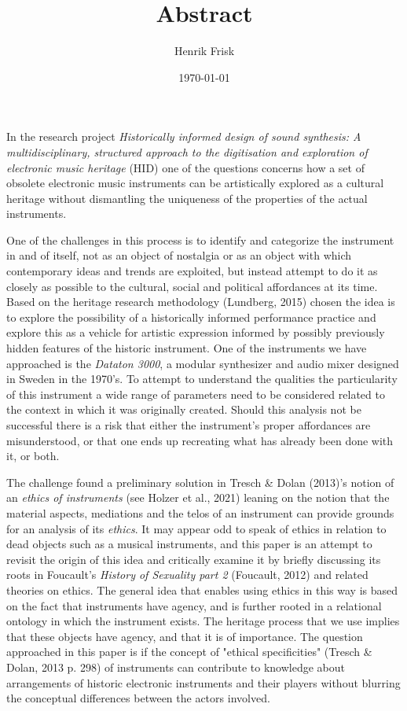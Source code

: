 \documentclass[11pt]{article}
\author{Henrik Frisk}
\date{\today}
\title{Abstract}
\begin{document}
\maketitle
\tableofcontents

In the research project \emph{Historically informed design of sound synthesis: A multidisciplinary, structured approach to the digitisation and exploration of electronic music heritage} (HID) one of the questions concerns how a set of obsolete electronic music instruments can be artistically explored as a cultural heritage without dismantling the uniqueness of the properties of the actual instruments. 

One of the challenges in this process is to identify and categorize the instrument in and of itself, not as an object of nostalgia or as an object with which contemporary ideas and trends are exploited, but instead attempt to do it as closely as possible to the cultural, social and political affordances at its time. Based on the heritage research methodology  (Lundberg, 2015) chosen the idea is to explore the possibility of a historically informed performance practice and explore this as a vehicle for artistic expression informed by possibly previously hidden features of the historic instrument. One of the instruments we have approached is the \emph{Dataton 3000}, a modular synthesizer and audio mixer designed in Sweden in the 1970's. To attempt to understand the qualities the particularity of this instrument a wide range of parameters need to be considered related to the context in which it was originally created. Should this analysis not be successful there is a risk that either the instrument's proper affordances are misunderstood, or that one ends up recreating what has already been done with it, or both.

The challenge found a preliminary solution in Tresch \& Dolan (2013)'s notion of an \emph{ethics of instruments} (see Holzer et al., 2021) leaning on the notion that the material aspects, mediations and the telos of an instrument can provide grounds for an analysis of its \emph{ethics}. It may appear odd to speak of ethics in relation to dead objects such as a musical instruments, and this paper is an attempt to revisit the origin of this idea and critically examine it by briefly discussing its roots in Foucault's \emph{History of Sexuality part 2} (Foucault, 2012) and related theories on ethics. The general idea that enables using ethics in this way is based on the fact that instruments have agency, and is further rooted in a relational ontology in which the instrument exists. The heritage process that we use implies that these objects have agency, and that it is of importance. The question approached in this paper is if the concept of "ethical specificities" (Tresch \& Dolan, 2013 p. 298) of instruments can contribute to knowledge about arrangements of historic electronic instruments and their players without blurring the conceptual differences between the actors involved.
\end{document}
